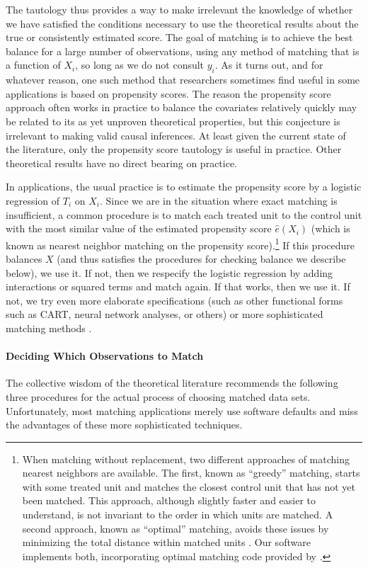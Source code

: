 \documentclass[11pt,titlepage]{article}
\begin{document}
The tautology thus provides a way to make irrelevant the knowledge of
whether we have satisfied the conditions necessary to use the
theoretical results about the true or consistently estimated score.
The goal of matching is to achieve the best balance for a large number
of observations, using any method of matching that is a function of
$X_i$, so long as we do not consult $y_i$.  As it turns out, and for
whatever reason, one such method that researchers sometimes find
useful in some applications is based on propensity scores.  The reason
the propensity score approach often works in practice to balance the
covariates relatively quickly may be related to its as yet unproven
theoretical properties, but this conjecture is irrelevant to making
valid causal inferences.  At least given the current state of the
literature, only the propensity score tautology is useful in practice.
Other theoretical results have no direct bearing on practice.

In applications, the usual practice is to estimate the propensity
score by a logistic regression of $T_i$ on $X_i$.  Since we are in the
situation where exact matching is insufficient, a common procedure is
to match each treated unit to the control unit with the most similar
value of the estimated propensity score $\hat{e}(X_i)$ (which is known
as nearest neighbor matching on the propensity score).\footnote{When
  matching without replacement, two different approaches of matching
  nearest neighbors are available. The first, known as ``greedy''
  matching, starts with some treated unit and matches the closest
  control unit that has not yet been matched.  This approach, although
  slightly faster and easier to understand, is not invariant to the
  order in which units are matched.  A second approach, known as
  ``optimal'' matching, avoids these issues by minimizing the total
  distance within matched units \citep[e.g.,][]{Rosenbaum89}.  Our
  software implements both, incorporating optimal matching code
  provided by \citet{Hansen04}.}  If this procedure balances $X$ (and
thus satisfies the procedures for checking balance we describe below),
we use it.  If not, then we respecify the logistic regression by
adding interactions or squared terms and match again.  If that works,
then we use it.  If not, we try even more elaborate specifications
(such as other functional forms such as CART, neural network analyses,
or others) or more sophisticated matching methods
\citep{Frolich04,SmiTod05}.

\paragraph{Deciding Which Observations to Match}
The collective wisdom of the theoretical literature recommends the
following three procedures for the actual process of choosing matched
data sets.  Unfortunately, most matching applications merely use
software defaults and miss the advantages of these more sophisticated
techniques.  
\end{document}
